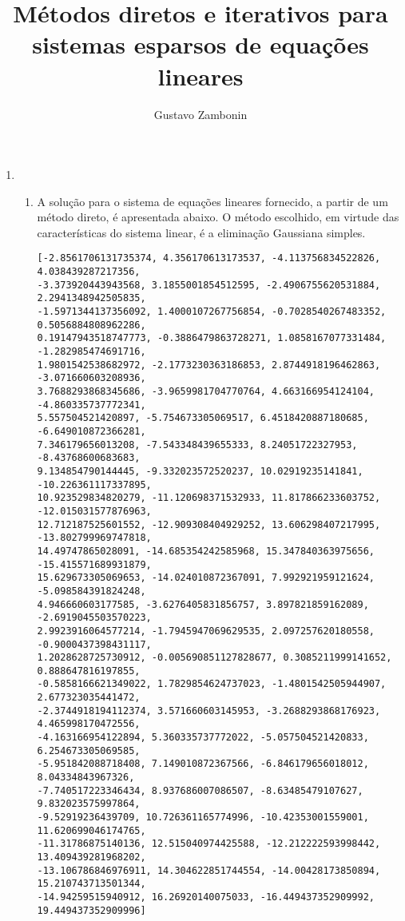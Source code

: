 \documentclass{sftex/sftex}
\title{Métodos diretos e iterativos para sistemas esparsos de equações lineares}
\author{Gustavo Zambonin}
\begin{document}
\maketitle

\begin{enumerate}

\item \begin{enumerate}

\item A solução para o sistema de equações lineares fornecido, a partir de um
método direto, é apresentada abaixo. O método escolhido, em virtude das
características do sistema linear, é a eliminação Gaussiana simples.

\begin{verbatim}
[-2.8561706131735374, 4.356170613173537, -4.113756834522826, 4.038439287217356,
-3.373920443943568, 3.1855001854512595, -2.4906755620531884, 2.2941348942505835,
-1.5971344137356092, 1.4000107267756854, -0.7028540267483352, 0.5056884808962286,
0.19147943518747773, -0.3886479863728271, 1.0858167077331484, -1.282985474691716,
1.9801542538682972, -2.1773230363186853, 2.8744918196462863, -3.071660603208936,
3.7688293868345686, -3.9659981704770764, 4.663166954124104, -4.860335737772341,
5.557504521420897, -5.754673305069517, 6.4518420887180685, -6.649010872366281,
7.346179656013208, -7.543348439655333, 8.24051722327953, -8.43768600683683,
9.134854790144445, -9.332023572520237, 10.02919235141841, -10.226361117337895,
10.923529834820279, -11.120698371532933, 11.817866233603752, -12.015031577876963,
12.712187525601552, -12.909308404929252, 13.606298407217995, -13.802799969747818,
14.49747865028091, -14.685354242585968, 15.347840363975656, -15.415571689931879,
15.629673305069653, -14.024010872367091, 7.992921959121624, -5.098584391824248,
4.946660603177585, -3.6276405831856757, 3.897821859162089, -2.6919045503570223,
2.9923916064577214, -1.7945947069629535, 2.097257620180558, -0.9000437398431117,
1.2028628725730912, -0.005690851127828677, 0.3085211999141652, 0.888647816197855,
-0.5858166621349022, 1.7829854624737023, -1.4801542505944907, 2.677323035441472,
-2.3744918194112374, 3.571660603145953, -3.2688293868176923, 4.465998170472556,
-4.163166954122894, 5.360335737772022, -5.057504521420833, 6.254673305069585,
-5.951842088718408, 7.149010872367566, -6.846179656018012, 8.04334843967326,
-7.740517223346434, 8.937686007086507, -8.63485479107627, 9.832023575997864,
-9.52919236439709, 10.726361165774996, -10.42353001559001, 11.620699046174765,
-11.31786875140136, 12.515040974425588, -12.212222593998442, 13.409439281968202,
-13.106786846976911, 14.304622851744554, -14.00428173850894, 15.210743713501344,
-14.94259515940912, 16.26920140075033, -16.449437352909992, 19.449437352909996]
\end{verbatim}


\end{enumerate}
\end{enumerate}
\end{document}
